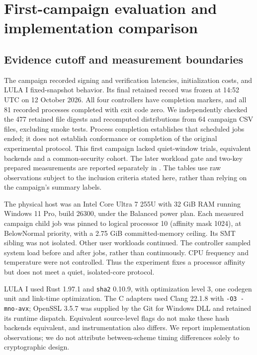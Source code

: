 \section{First-campaign evaluation and implementation comparison}\label{sec:benchcomparison}
\subsection{Evidence cutoff and measurement boundaries}
The campaign recorded signing and verification latencies, initialization costs, and LULA I fixed-snapshot behavior. Its final retained record was frozen at 14:52 UTC on 12 October 2026. All four controllers have completion markers, and all 81 recorded processes completed with exit code zero. We independently checked the 477 retained file digests and recomputed distributions from 64 campaign CSV files, excluding smoke tests. Process completion establishes that scheduled jobs ended; it does not establish conformance or completion of the original experimental protocol. This first campaign lacked quiet-window trials, equivalent backends and a common-security cohort. The later workload gate and two-key prepared measurements are reported separately in . The tables use raw observations subject to the inclusion criteria stated here, rather than relying on the campaign's summary labels.

The physical host was an Intel Core Ultra 7 255U with 32 GiB RAM running Windows 11 Pro, build 26300, under the Balanced power plan. Each measured campaign child job was pinned to logical processor 10 (affinity mask 1024), at BelowNormal priority, with a 2.75 GiB committed-memory ceiling. Its SMT sibling was not isolated. Other user workloads continued. The controller sampled system load before and after jobs, rather than continuously. CPU frequency and temperature were not controlled. Thus the experiment fixes a processor affinity but does not meet a quiet, isolated-core protocol.

LULA I used Rust 1.97.1 and \texttt{sha2} 0.10.9, with optimization level 3, one codegen unit and link-time optimization. The C adapters used Clang 22.1.8 with \texttt{-O3 -mno-avx}; OpenSSL 3.5.7 was supplied by the Git for Windows DLL and retained its runtime dispatch. Equivalent source-level flags do not make these hash backends equivalent, and instrumentation also differs. We report implementation observations; we do not attribute between-scheme timing differences solely to cryptographic design.

